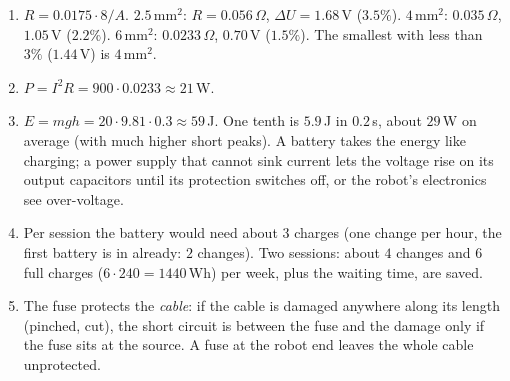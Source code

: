\begin{enumerate}[label=\textbf{\ansnum.\arabic*}]
  \item $R=0.0175\cdot8/A$. $2.5$\,mm$^2$: $R=0.056\,\Omega$, $\Delta U=1.68$\,V ($3.5\%$). $4$\,mm$^2$: $0.035\,\Omega$, $1.05$\,V ($2.2\%$). $6$\,mm$^2$: $0.0233\,\Omega$, $0.70$\,V ($1.5\%$). The smallest with less than $3\%$ ($1.44$\,V) is $4$\,mm$^2$.
  \item $P=I^2R=900\cdot0.0233\approx21$\,W.
  \item $E=mgh=20\cdot9.81\cdot0.3\approx59$\,J. One tenth is $5.9$\,J in $0.2$\,s, about $29$\,W on average (with much higher short peaks). A battery takes the energy like charging; a power supply that cannot sink current lets the voltage rise on its output capacitors until its protection switches off, or the robot's electronics see over-voltage.
  \item Per session the battery would need about $3$ charges (one change per hour, the first battery is in already: $2$ changes). Two sessions: about $4$ changes and $6$ full charges ($6\cdot240=1440$\,Wh) per week, plus the waiting time, are saved.
  \item The fuse protects the \emph{cable}: if the cable is damaged anywhere along its length (pinched, cut), the short circuit is between the fuse and the damage only if the fuse sits at the source. A fuse at the robot end leaves the whole cable unprotected.
\end{enumerate}

